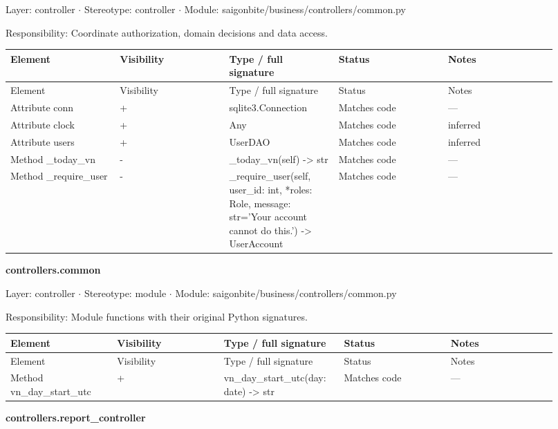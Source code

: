 Layer: controller \ensuremath{\cdot} Stereotype: \guillemotleft{}controller\guillemotright{} \ensuremath{\cdot} Module: saigonbite/business/controllers/common.py

Responsibility: Coordinate authorization, domain decisions and data access.

\begin{longtable}{>{\raggedright\arraybackslash}p{0.1840\linewidth}>{\raggedright\arraybackslash}p{0.1840\linewidth}>{\raggedright\arraybackslash}p{0.1840\linewidth}>{\raggedright\arraybackslash}p{0.1840\linewidth}>{\raggedright\arraybackslash}p{0.1840\linewidth}}
Element & Visibility & Type / full signature & Status & Notes \\
\hline\endfirsthead
Element & Visibility & Type / full signature & Status & Notes \\
\hline\endhead
Attribute conn & + & sqlite3.Connection & Matches code & --- \\
Attribute clock & + & Any & Matches code & inferred \\
Attribute users & + & UserDAO & Matches code & inferred \\
Method \_today\_vn & - & \_today\_vn(self) -\textgreater{} str & Matches code & --- \\
Method \_require\_user & - & \_require\_user(self, user\_id: int, *roles: Role, message: str='Your account cannot do this.') -\textgreater{} UserAccount & Matches code & --- \\
\end{longtable}
\textbf{controllers.common}

Layer: controller \ensuremath{\cdot} Stereotype: \guillemotleft{}module\guillemotright{} \ensuremath{\cdot} Module: saigonbite/business/controllers/common.py

Responsibility: Module functions with their original Python signatures.

\begin{longtable}{>{\raggedright\arraybackslash}p{0.1840\linewidth}>{\raggedright\arraybackslash}p{0.1840\linewidth}>{\raggedright\arraybackslash}p{0.1840\linewidth}>{\raggedright\arraybackslash}p{0.1840\linewidth}>{\raggedright\arraybackslash}p{0.1840\linewidth}}
Element & Visibility & Type / full signature & Status & Notes \\
\hline\endfirsthead
Element & Visibility & Type / full signature & Status & Notes \\
\hline\endhead
Method vn\_day\_start\_utc & + & vn\_day\_start\_utc(day: date) -\textgreater{} str & Matches code & --- \\
\end{longtable}
\textbf{controllers.report\_controller}

